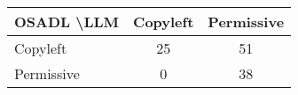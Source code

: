 \begin{tabular}{l|cc}\hline
	\textbf{OSADL \textbackslash LLM} & Copyleft & Permissive\\\hline
	Copyleft & 25 & 51\\
	Permissive & 0 & 38\\\hline
\end{tabular}
